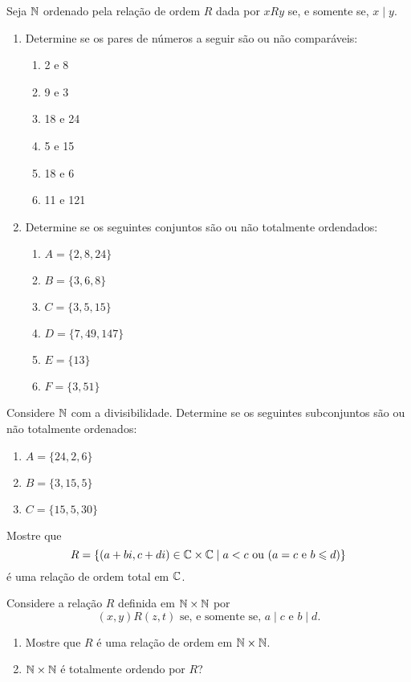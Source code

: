 \documentclass[12pt]{article}
\begin{document}
\questao Seja $\mathbb{N}$ ordenado pela relação de ordem $R$ dada por $xRy$ se, e somente se, $x \mid y$.
\begin{enumerate}
	\item Determine se os pares de números a seguir são ou não comparáveis:
	\begin{multicols}{2}
		\begin{enumerate}
			\item 2 e 8
			\item 9 e 3
			\item 18 e 24
			\item 5 e 15
			\item 18 e 6
			\item 11 e 121
		\end{enumerate}
	\end{multicols}
	\item Determine se os seguintes conjuntos são ou não totalmente ordendados:
	\begin{multicols}{2}
		\begin{enumerate}
			\item $A = \{2,8,24\}$
			\item $B = \{3,6,8\}$
			\item $C = \{3,5,15\}$
			\item $D = \{7,49,147\}$
			\item $E = \{13\}$
			\item $F = \{3,51\}$
		\end{enumerate}
	\end{multicols}
\end{enumerate}

\vesp

\questao Considere $\mathbb{N}$ com a divisibilidade. Determine se os seguintes subconjuntos são ou não totalmente ordenados:
\begin{enumerate}[label={\alph*})]
	\item $A = \{24,2,6\}$
	\item $B = \{3,15,5\}$
	\item $C = \{15,5,30\}$
\end{enumerate}

\vesp

\questao Mostre que
\[
	R = \{(a + bi, c + di) \in \mathbb{C} \times \mathbb{C} \mid a < c \mbox{ ou } (a = c \mbox{ e } b \leqslant d)\}
\]
é uma relação de ordem total em $\mathbb{C}$.

\vesp

\questao Considere a relação $R$ definida em $\mathbb{N} \times \mathbb{N}$ por
\[
	(x,y)R(z,t) \mbox{ se, e somente se, } a \mid c \mbox{ e } b \mid d.
\]
\begin{enumerate}
	\item Mostre que $R$ é uma relação de ordem em $\mathbb{N} \times \mathbb{N}$.
	\item $\mathbb{N} \times \mathbb{N}$ é totalmente ordendo por $R$?
\end{enumerate}
\end{document}
